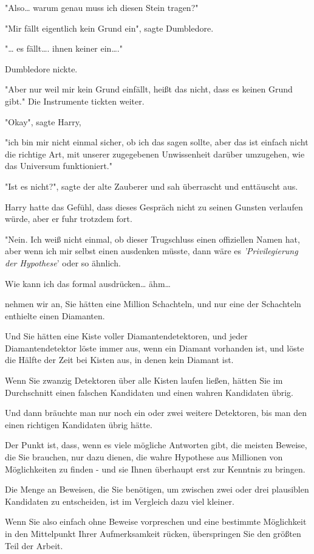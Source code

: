 {"Also… warum genau muss ich diesen Stein tragen?"

"Mir fällt eigentlich kein Grund ein", sagte Dumbledore.

"… es fällt…. ihnen keiner ein…."

Dumbledore nickte.

"Aber nur weil mir kein Grund einfällt, heißt das nicht, dass es keinen Grund gibt." Die Instrumente tickten weiter.

"Okay", sagte Harry,

"ich bin mir nicht einmal sicher, ob ich das sagen sollte, aber das ist einfach nicht die richtige Art, mit unserer zugegebenen Unwissenheit darüber umzugehen, wie das Universum funktioniert."

"Ist es nicht?", sagte der alte Zauberer und sah überrascht und enttäuscht aus.

Harry hatte das Gefühl, dass dieses Gespräch nicht zu seinen Gunsten verlaufen würde, aber er fuhr trotzdem fort.

"Nein. Ich weiß nicht einmal, ob dieser Trugschluss einen offiziellen Namen hat, aber wenn ich mir selbst einen ausdenken müsste, dann wäre es \emph{'Privilegierung der Hypothese}' oder so ähnlich.

Wie kann ich das formal ausdrücken… ähm…

nehmen wir an, Sie hätten eine Million Schachteln, und nur eine der Schachteln enthielte einen Diamanten.

Und Sie hätten eine Kiste voller Diamantendetektoren, und jeder Diamantendetektor löste immer aus, wenn ein Diamant vorhanden ist, und löste die Hälfte der Zeit bei Kisten aus, in denen kein Diamant ist.

Wenn Sie zwanzig Detektoren über alle Kisten laufen ließen, hätten Sie im Durchschnitt einen falschen Kandidaten und einen wahren Kandidaten übrig.

Und dann bräuchte man nur noch ein oder zwei weitere Detektoren, bis man den einen richtigen Kandidaten übrig hätte.

Der Punkt ist, dass, wenn es viele mögliche Antworten gibt, die meisten Beweise, die Sie brauchen, nur dazu dienen, die wahre Hypothese aus Millionen von Möglichkeiten zu finden - und sie Ihnen überhaupt erst zur Kenntnis zu bringen.

Die Menge an Beweisen, die Sie benötigen, um zwischen zwei oder drei plausiblen Kandidaten zu entscheiden, ist im Vergleich dazu viel kleiner.

Wenn Sie also einfach ohne Beweise vorpreschen und eine bestimmte Möglichkeit in den Mittelpunkt Ihrer Aufmerksamkeit rücken, überspringen Sie den größten Teil der Arbeit.

}

